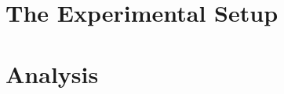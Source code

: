 \documentclass[11pt]{ksudiss}                          %
\begin{document}
\chapter{\bf{The Experimental Setup}}    %


\chapter{\bf{Analysis}}    %


%


%
%
%


%
%
%
%
%

\printbibliography


\appendix

%
\end{document}

